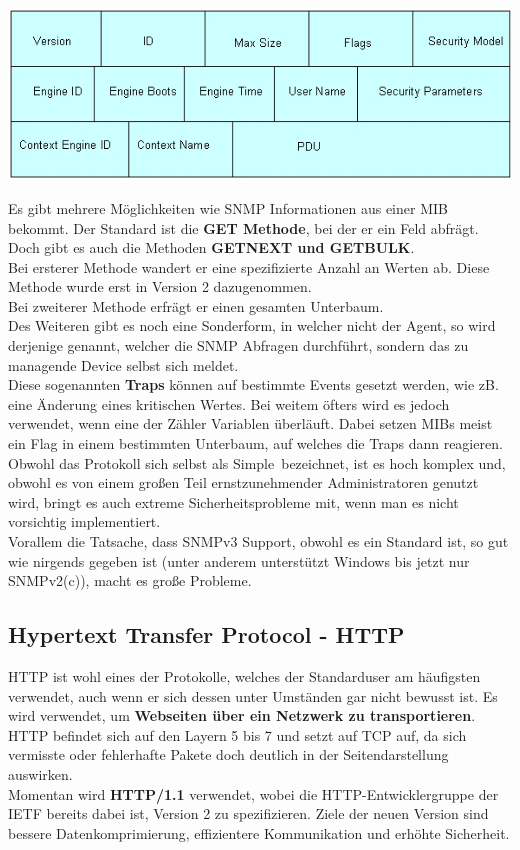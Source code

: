 \documentclass[12pt,a4paper]{report}
\begin{document}
\begin{center}
\includegraphics[scale=0.7]{../docs/tarkes/pics/snmpheader.jpg}
\end{center}

Es gibt mehrere Möglichkeiten wie SNMP Informationen aus einer MIB bekommt. Der Standard ist die \textbf{GET Methode}, bei der er ein Feld abfrägt. Doch gibt es auch die Methoden \textbf{GETNEXT und GETBULK}.\\
Bei ersterer Methode wandert er eine spezifizierte Anzahl an Werten ab. Diese Methode wurde erst in Version 2 dazugenommen.\\
Bei zweiterer Methode erfrägt er einen gesamten Unterbaum.\\

Des Weiteren gibt es noch eine Sonderform, in welcher nicht der Agent, so wird derjenige genannt, welcher die SNMP Abfragen durchführt, sondern das zu managende Device selbst sich meldet.\\
Diese sogenannten \textbf{Traps} können auf bestimmte Events gesetzt werden, wie zB. eine Änderung eines kritischen Wertes. Bei weitem öfters wird es jedoch verwendet, wenn eine der Zähler Variablen überläuft. Dabei setzen MIBs meist ein Flag in einem bestimmten Unterbaum, auf welches die Traps dann reagieren.\\

Obwohl das Protokoll sich selbst als \glqq Simple\grqq \ bezeichnet, ist es hoch komplex und, obwohl es von einem großen Teil ernstzunehmender Administratoren genutzt wird, bringt es auch extreme Sicherheitsprobleme mit, wenn man es nicht vorsichtig implementiert.\\
Vorallem die Tatsache, dass SNMPv3 Support, obwohl es ein Standard ist, so gut wie nirgends gegeben ist (unter anderem unterstützt Windows bis jetzt nur SNMPv2(c)), macht es große Probleme. 
\subsection{Hypertext Transfer Protocol - HTTP}
HTTP ist wohl eines der Protokolle, welches der Standarduser am häufigsten verwendet, auch wenn er sich dessen unter Umständen gar nicht bewusst ist. Es wird verwendet, um \textbf{Webseiten über ein Netzwerk zu transportieren}. HTTP befindet sich auf den Layern 5 bis 7 und setzt auf TCP auf, da sich vermisste oder fehlerhafte Pakete doch deutlich in der Seitendarstellung auswirken.\\
Momentan wird \textbf{HTTP/1.1} verwendet, wobei die HTTP-Entwicklergruppe der IETF bereits dabei ist, Version 2 zu spezifizieren. Ziele der neuen Version sind bessere Datenkomprimierung, effizientere Kommunikation und erhöhte Sicherheit.\\
\end{document}
